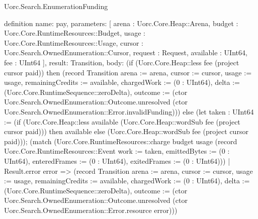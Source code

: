 \begin{lexlean}{Uorc.Search.EnumerationFunding}
\begin{semanticmodule}
definition{
  name: pay,
  parameters: [
    arena : Uorc.Core.Heap::Arena,
    budget : Uorc.Core.RuntimeResources::Budget,
    usage : Uorc.Core.RuntimeResources::Usage,
    cursor : Uorc.Search.OwnedEnumeration::Cursor,
    request : Request,
    available : UInt64,
    fee : UInt64
  ],
  result: Transition,
  body: (if (Uorc.Core.Heap::less fee (project cursor paid)) then (record Transition {arena := arena, cursor := cursor, usage := usage, remainingCredits := available, chargedWork := (0 : UInt64), delta := (Uorc.Core.RuntimeSequence::zeroDelta), outcome := (ctor Uorc.Search.OwnedEnumeration::Outcome.unresolved (ctor Uorc.Search.OwnedEnumeration::Error.invalidFunding))}) else (let taken : UInt64 := (if (Uorc.Core.Heap::less available (Uorc.Core.Heap::wordSub fee (project cursor paid))) then available else (Uorc.Core.Heap::wordSub fee (project cursor paid))); (match (Uorc.Core.RuntimeResources::charge budget usage (record Uorc.Core.RuntimeResources::Event {work := taken, emittedBytes := (0 : UInt64), enteredFrames := (0 : UInt64), exitedFrames := (0 : UInt64)}))
    | Result.error error => (record Transition {arena := arena, cursor := cursor, usage := usage, remainingCredits := available, chargedWork := (0 : UInt64), delta := (Uorc.Core.RuntimeSequence::zeroDelta), outcome := (ctor Uorc.Search.OwnedEnumeration::Outcome.unresolved (ctor Uorc.Search.OwnedEnumeration::Error.resource error))})
}
\end{semanticmodule}
\end{lexlean}
